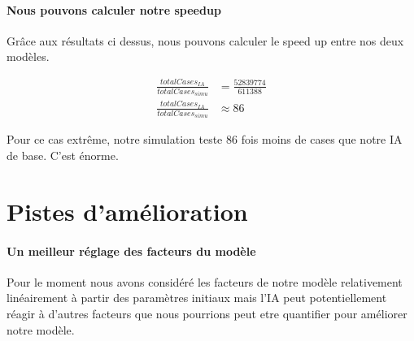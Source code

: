 		\paragraph{Nous pouvons calculer notre speedup}
		Grâce aux résultats ci dessus, nous pouvons calculer le speed up entre nos deux modèles.
		
		\begin{align}
			\frac{totalCases_{IA}}{totalCases_{simu}} &= \frac{52839774}{611388}\\
			\frac{totalCases_{IA}}{totalCases_{simu}} &\approx 86 
		\end{align}
		
		\begin{result}
			Pour ce cas extrême, notre simulation teste 86 fois moins de cases que notre IA de base. C'est énorme.
		\end{result}
	
	\section{Pistes d'amélioration}
	
		\paragraph{Un meilleur réglage des facteurs du modèle}
		Pour le moment nous avons considéré les facteurs de notre modèle relativement linéairement à partir des paramètres initiaux mais l'IA peut potentiellement réagir à d'autres facteurs que nous pourrions peut etre quantifier pour améliorer notre modèle.
	